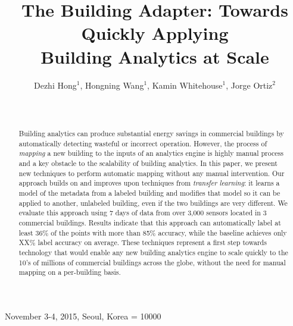 \documentclass{acm_proc_article-sp}
\begin{document}
 {November 3-4, 2015, Seoul, Korea} 
\widowpenalty = 10000

\title{The Building Adapter: Towards Quickly Applying\\ Building Analytics at Scale}

\author{
\alignauthor
Dezhi Hong$^1$,  Hongning Wang$^1$,  Kamin Whitehouse$^1$, Jorge Ortiz$^2$\\
	\\
	\\
}

\maketitle
\begin{abstract}
Building analytics can produce substantial energy savings in commercial
buildings by automatically detecting wasteful or incorrect operation.  However,
the process of {\em mapping} a new building to the inputs of an analytics engine
is highly manual process and a key obstacle to the scalability of building
analytics.  In this paper, we present new techniques to perform automatic
mapping without any manual intervention.  Our approach builds on and improves
upon techniques from {\em transfer learning}: it learns a model of the metadata
from a labeled building and modifies that model so it can be applied to another,
unlabeled building, even if the two buildings are very different. We evaluate
this approach using 7 days of data from over 3,000 sensors located in 3
commercial buildings. Results indicate that this approach can automatically
label at least 36\% of the points with more than 85\% accuracy, while the
baseline achieves only XX\% label accuracy on average.  These techniques
represent a first step towards technology that would enable any new building
analytics engine to scale quickly to the 10's of millions of commercial
buildings across the globe, without the need for manual mapping on a
per-building basis.
\end{abstract}

\end{document}
